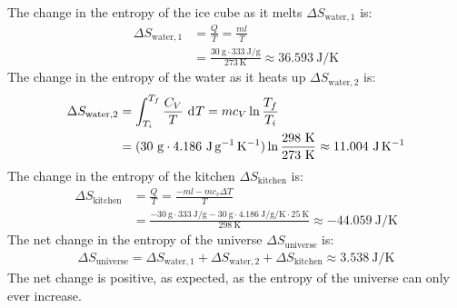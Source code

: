 \documentclass{article}
\begin{document}
The change in the entropy of the ice cube as it melts $\Delta S_{\text{water},1}$ is:
\begin{equation}
    \begin{split}
        \Delta S_{\text{water},1} & = \frac{Q}{T} = \frac{ml}{T} \\
        & = \frac{30~\unit{\gram} \cdot 333~\unit{\joule\per\gram}}{273~\unit{\kelvin}} \approx 36.593~\unit{\joule\per\kelvin}
    \end{split}
\end{equation}
The change in the entropy of the water as it heats up $\Delta S_{\text{water},2}$ is:
\begin{equation}
    \begin{split}
        \Delta S_{\text{water},2} & = \int_{T_i}^{T_f} \frac{C_V}{T} \, \diff{T} = mc_V\ln\frac{T_f}{T_i} \\
        & = (30~\unit{\gram} \cdot 4.186~\unit{\joule\per\gram\per\kelvin})\ln\frac{298~\unit{\kelvin}}{273~\unit{\kelvin}} \approx 11.004~\unit{\joule\per\kelvin}
    \end{split}
\end{equation}
The change in the entropy of the kitchen $\Delta S_{\text{kitchen}}$ is:
\begin{equation}
    \begin{split}
        \Delta S_{\text{kitchen}} & = \frac{Q}{T} = \frac{-ml - mc_v\Delta T}{T} \\
        & = \frac{-30~\unit{\gram} \cdot 333~\unit{\joule\per\gram} - 30~\unit{\gram} \cdot 4.186~\unit{\joule\per\gram\per\kelvin} \cdot 25~\unit{\kelvin}}{298~\unit{\kelvin}} \approx -44.059~\unit{\joule\per\kelvin}
    \end{split}
\end{equation}
The net change in the entropy of the universe $\Delta S_{\text{universe}}$ is:
\begin{equation}
    \begin{split}
        \Delta S_{\text{universe}} = \Delta S_{\text{water},1} + \Delta S_{\text{water},2} + \Delta S_{\text{kitchen}} \approx 3.538~\unit{\joule\per\kelvin}
    \end{split}
\end{equation}
The net change is positive, as expected, as the entropy of the universe can only ever increase.
\end{document}
